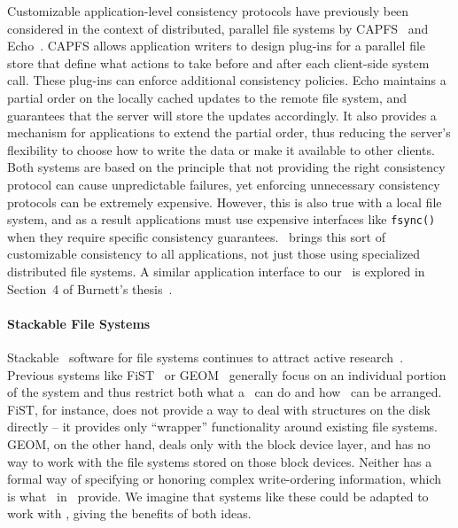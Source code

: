 Customizable application-level consistency protocols have previously been
considered in the context of distributed, parallel file systems by
CAPFS~\cite{vilayannur05providing} and Echo~\cite{mann94coherent}.
%
CAPFS allows application writers to design plug-ins for a parallel file store
that define what actions to take before and after each client-side system
call.
%
These plug-ins can enforce additional consistency policies.
%
Echo maintains a partial order on the locally cached updates to the remote file
system, and guarantees that the server will store the updates accordingly. It
also provides a mechanism for applications to extend the partial order, thus
reducing the server's flexibility to choose how to write the data or make it
available to other clients.
%
Both systems are based on the principle that not providing the right
consistency protocol can cause unpredictable failures, yet enforcing
unnecessary consistency protocols can be extremely expensive.
%
However, this is also true with a local file system, and as a result
applications must use expensive interfaces like \texttt{fsync()} when they
require specific consistency guarantees.
%
\Kudos\ brings this sort of customizable consistency to all applications, not
just those using specialized distributed file systems.
%
A similar application interface to our \patchgroups\ is explored in
Section~4 of Burnett's thesis~\cite{burnett06information}.



\paragraph{Stackable File Systems}


Stackable \module\ software for file systems continues to attract active
research~\cite{rosenthal90evolving, heidemann91layered, skinner93stacking,
heidemann94filesystem,zadok99extending,
zadok00fist,wright03ncryptfs,wright06versatility}. Previous
systems like FiST~\cite{zadok00fist} or GEOM~\cite{geom} generally focus on
an individual portion of the system and thus restrict both what a \module\
can do and how \modules\ can be arranged. FiST, for instance, does not
provide a way to deal with structures on the disk directly -- it provides
only ``wrapper'' functionality around existing file
systems. %
GEOM, on the other hand, deals only with the block device layer, and has no
way to work with the file systems stored on those block devices. Neither
has a formal way of specifying or honoring complex write-ordering
information, which is what \chdescs\ in \Kudos\ provide. We imagine that
systems like these could be adapted to work with \chdescs, giving the
benefits of both ideas.

